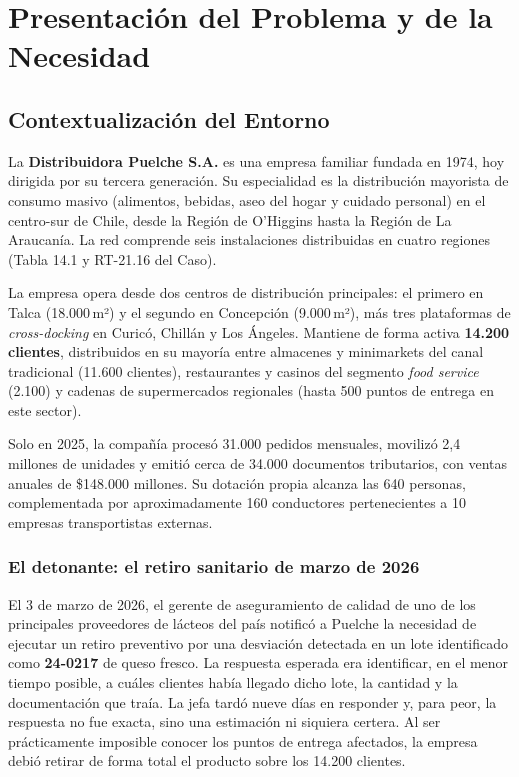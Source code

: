 \chapter{Presentación del Problema y de la Necesidad}
\label{sec:problema}

\section{Contextualización del Entorno}

La \textbf{Distribuidora Puelche S.A.} es una empresa familiar fundada en 1974, hoy
dirigida por su tercera generación. Su especialidad es la distribución mayorista de
consumo masivo (alimentos, bebidas, aseo del hogar y cuidado personal) en el centro-sur
de Chile, desde la Región de O'Higgins hasta la Región de La Araucanía. La red comprende
seis instalaciones distribuidas en cuatro regiones (Tabla 14.1 y RT-21.16 del Caso).

La empresa opera desde dos centros de distribución principales: el primero en Talca
(18.000\,m²) y el segundo en Concepción (9.000\,m²), más tres plataformas de
\emph{cross-docking} en Curicó, Chillán y Los Ángeles. Mantiene de forma activa
\textbf{14.200 clientes}, distribuidos en su mayoría entre almacenes y minimarkets del
canal tradicional (11.600 clientes), restaurantes y casinos del segmento \emph{food
service} (2.100) y cadenas de supermercados regionales (hasta 500 puntos de entrega en
este sector).

Solo en 2025, la compañía procesó 31.000 pedidos mensuales, movilizó 2,4 millones de
unidades y emitió cerca de 34.000 documentos tributarios, con ventas anuales de \$148.000
millones. Su dotación propia alcanza las 640 personas, complementada por
aproximadamente 160 conductores pertenecientes a 10 empresas transportistas externas.

\subsection{El detonante: el retiro sanitario de marzo de 2026}

El 3 de marzo de 2026, el gerente de aseguramiento de calidad de uno de los principales
proveedores de lácteos del país notificó a Puelche la necesidad de ejecutar un retiro
preventivo por una desviación detectada en un lote identificado como \textbf{24-0217} de
queso fresco. La respuesta esperada era identificar, en el menor tiempo posible, a cuáles
clientes había llegado dicho lote, la cantidad y la documentación que traía. La jefa
tardó nueve días en responder y, para peor, la respuesta no fue exacta, sino una
estimación ni siquiera certera. Al ser prácticamente imposible conocer los puntos de
entrega afectados, la empresa debió retirar de forma total el producto sobre los 14.200
clientes.


